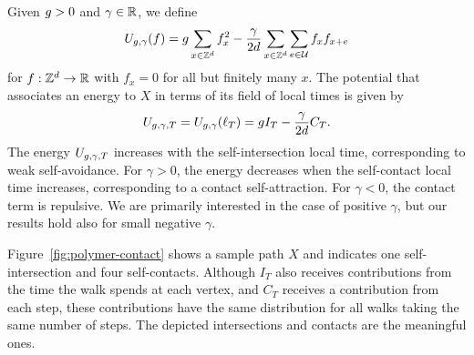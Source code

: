 Given $g > 0$ and $\gamma \in {\mathbb R}$,
we define
\begin{equation}
\label{e:Udef-neg}
U_{g,\gamma}(f)
=
g \sum_{x\in{ {{\mathbb Z}}^d }} f_x^2
- \frac{\gamma}{2d}
\sum_{x\in{ {{\mathbb Z}}^d }} \sum_{e\in\mathcal{U}} f_x f_{x+e}
\end{equation}
for $f:{ {{\mathbb Z}}^d }\rightarrow {\mathbb R}$ with $f_x = 0$
for all but finitely many $x$.
The potential that associates an energy to $X$ in terms of its
field of local times is given by
\begin{equation}
  \label{e:V}
  U_{g,\gamma,T}
  =
  U_{g,\gamma}(\ell_T)
  =
  g I_T
  - \frac{\gamma}{2d}
  C_T
  .
\end{equation}
The energy $U_{g,\gamma,T}$ increases with the self-intersection local time,
corresponding to weak self-avoidance.  For $\gamma >0$, the energy decreases
when the self-contact local time increases, corresponding to a contact self-attraction.
For $\gamma<0$, the contact term is repulsive.  We are primarily interested in
the case of positive $\gamma$, but our results hold also for small negative $\gamma$.

Figure~\ref{fig:polymer-contact} shows a sample path $X$
and indicates one self-intersection and four self-contacts.
Although $I_T$ also receives contributions from the
time the walk spends at each vertex, and $C_T$ receives a contribution from each step,
these contributions have the same distribution for all walks taking the same number
of steps.  The depicted intersections and contacts are the meaningful ones.


